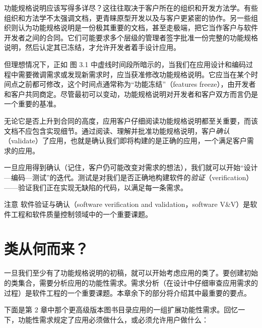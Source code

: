
功能规格说明应该写得多详尽？这往往取决于客户所在的组织和开发方法学。有些组织和方法学不太强调文档，更青睐原型开发以及与客户更紧密的协作。另一些组织则认为功能规格说明是一份极其重要的文档，甚至走极端，把它当作客户与软件开发者之间的合同。它们可能要求多个层级的管理者签字批准一份完整的功能规格说明，然后认定其已冻结，才允许开发者着手设计应用。

但理想情况下，正如 图 3.1 中虚线时间段所暗示的，当我们在应用设计和编码过程中需要微调需求或发现新需求时，应当获准修改功能规格说明。它应当在某个时间点之前都可修改，这个时间点通常称为“功能冻结”（features freeze），由开发者和客户共同商定。尽管最初可以变动，功能规格说明对开发者和客户双方而言仍是一个重要的基准。

无论它是否上升到合同的高度，应用客户仔细阅读功能规格说明都至关重要，而该文档不应包含实现细节。通过阅读、理解并批准功能规格说明，客户\emph{确认}（validate）了应用，也就是确认我们即将构建的是正确的应用，一个满足客户需求的应用。

一旦应用得到确认（记住，客户仍可能改变对需求的想法），我们就可以开始“设计—编码—测试”的迭代。测试是对我们是否正确地构建软件的\emph{验证}（verification）——验证我们正在实现无缺陷的代码，以满足每一条需求。

\begin{myWarning}{注意}
软件验证与确认（software verification and validation，software V\&V）是软件工程和软件质量控制领域中的一个重要课题。
\end{myWarning}

\section{类从何而来？}

一旦我们至少有了功能规格说明的初稿，就可以开始考虑应用的类了。要创建初始的类集合，需要分析应用的功能性需求。需求分析（在设计中仔细审查应用需求的过程）是软件工程的一个重要课题。本章余下的部分将介绍其中最重要的要点。


下面是第 2 章中那个更高级版本图书目录应用的一组扩展功能性需求。回忆一下，功能性需求规定了应用必须做什么，或必须允许用户做什么：

